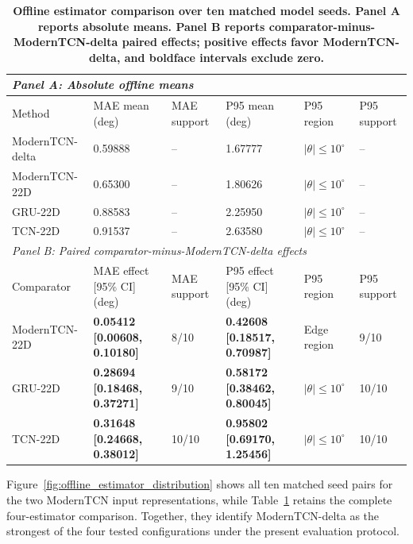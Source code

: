 \documentclass{ieeeaccess}
\begin{document}
\begin{table}[!tbp]
\centering
\caption{\textbf{Offline estimator comparison over ten matched model seeds. Panel A reports absolute means. Panel B reports comparator-minus-ModernTCN-delta paired effects; positive effects favor ModernTCN-delta, and boldface intervals exclude zero.}}
\label{tab:estimator_and_delta_results}
\scriptsize
\setlength{\tabcolsep}{2.6pt}
\begin{tabular}{|p{}|p{}|p{}|p{}|p{}|p{}|}
\hline
\multicolumn{6}{|l|}{\textit{Panel A: Absolute offline means}} \\
\hline
Method & MAE mean (deg) & MAE support & P95 mean (deg) & P95 region & P95 support \\
\hline
ModernTCN-delta & 0.59888 & -- & 1.67777 & $|\theta|\leq10^{\circ}$ & -- \\
ModernTCN-22D & 0.65300 & -- & 1.80626 & $|\theta|\leq10^{\circ}$ & -- \\
GRU-22D & 0.88583 & -- & 2.25950 & $|\theta|\leq10^{\circ}$ & -- \\
TCN-22D & 0.91537 & -- & 2.63580 & $|\theta|\leq10^{\circ}$ & -- \\
\hline
\multicolumn{6}{|l|}{\textit{Panel B: Paired comparator-minus-ModernTCN-delta effects}} \\
\hline
Comparator & MAE effect [95\% CI] (deg) & MAE support & P95 effect [95\% CI] (deg) & P95 region & P95 support \\
\hline
ModernTCN-22D & \textbf{0.05412 [0.00608, 0.10180]} & 8/10 & \textbf{0.42608 [0.18517, 0.70987]} & Edge region & 9/10 \\
GRU-22D & \textbf{0.28694 [0.18468, 0.37271]} & 9/10 & \textbf{0.58172 [0.38462, 0.80045]} & $|\theta|\leq10^{\circ}$ & 10/10 \\
TCN-22D & \textbf{0.31648 [0.24668, 0.38012]} & 10/10 & \textbf{0.95802 [0.69170, 1.25456]} & $|\theta|\leq10^{\circ}$ & 10/10 \\
\hline
\end{tabular}
\end{table}

Figure~\ref{fig:offline_estimator_distribution} shows all ten matched seed pairs for the two ModernTCN input representations, while Table~\ref{tab:estimator_and_delta_results} retains the complete four-estimator comparison. Together, they identify ModernTCN-delta as the strongest of the four tested configurations under the present evaluation protocol.
\end{document}
